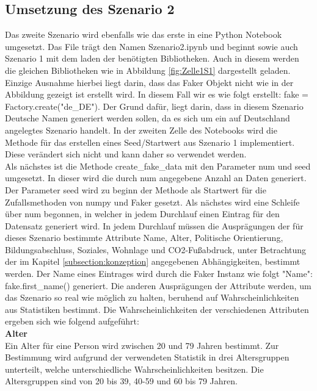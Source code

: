 \begin{onehalfspace}
\subsection{Umsetzung des Szenario 2}
\label{umsetzungsz2}
Das zweite Szenario wird ebenfalls wie das erste in eine Python Notebook umgesetzt. Das File trägt den Namen \glqq{}Szenario2.ipynb\grqq{} und beginnt sowie auch Szenario 1 mit dem laden der benötigten Bibliotheken. Auch in diesem werden die gleichen Bibliotheken wie in Abbildung \ref{fig:Zelle1S1} dargestellt geladen. Einzige Ausnahme hierbei liegt darin, dass das Faker Objekt nicht wie in der Abbildung gezeigt ist erstellt wird. In diesem Fall wir es wie folgt erstellt: \glqq{}fake = Factory.create("de\_DE")\grqq{}. Der Grund dafür, liegt darin, dass in diesem Szenario Deutsche Namen generiert werden sollen, da es sich um ein auf Deutschland angelegtes Szenario handelt. In der zweiten Zelle des Notebooks wird die Methode für das erstellen eines Seed/Startwert aus Szenario 1 implementiert. Diese verändert sich nicht und kann daher so verwendet werden.\\
Als nächstes ist die Methode \glqq{}create\_fake\_data\grqq{} mit den Parameter num und seed umgesetzt. In dieser wird die durch num angegebene Anzahl an Daten generiert. Der Parameter seed wird zu beginn der Methode als Startwert für die Zufallsmethoden von numpy und Faker gesetzt. Als nächstes wird eine Schleife über num begonnen, in welcher in jedem Durchlauf einen Eintrag für den Datensatz generiert wird. In jedem Durchlauf müssen die Ausprägungen der für dieses Szenario bestimmte Attribute Name, Alter, Politische Orientierung, Bildungsabschluss, Soziales, Wohnlage und CO2-Fußabdruck, unter Betrachtung der im Kapitel \ref{subsection:konzeption} angegebenen Abhängigkeiten, bestimmt werden. Der Name eines Eintrages wird durch die Faker Instanz wie folgt \glqq{}"Name": fake.first\_name()\grqq{} generiert. Die anderen Ausprägungen der Attribute werden, um das Szenario so real wie möglich zu halten, beruhend auf Wahrscheinlichkeiten aus Statistiken bestimmt. Die Wahrscheinlichkeiten der verschiedenen Attributen ergeben sich wie folgend aufgeführt:\\
\textbf{Alter}\\
Ein Alter für eine Person wird zwischen 20 und 79 Jahren bestimmt. Zur Bestimmung wird aufgrund der verwendeten Statistik in drei Altersgruppen unterteilt, welche unterschiedliche Wahrscheinlichkeiten besitzen. Die Altersgruppen sind von 20 bis 39, 40-59 und 60 bis 79 Jahren.\\

\end{onehalfspace}
